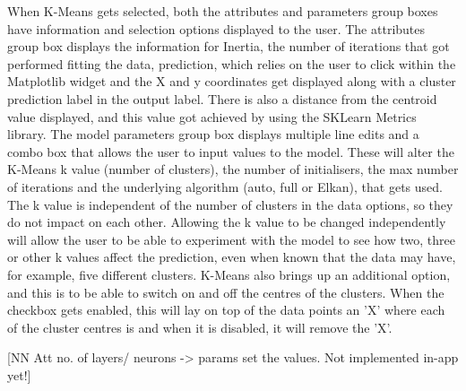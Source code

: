 	When K-Means gets selected, both the attributes and parameters group boxes have information and selection options displayed to the user. The attributes group box displays the information for Inertia, the number of iterations that got performed fitting the data, prediction, which relies on the user to click within the Matplotlib widget and the X and y coordinates get displayed along with a cluster prediction label in the output label. There is also a distance from the centroid value displayed, and this value got achieved by using the SKLearn Metrics library. The model parameters group box displays multiple line edits and a combo box that allows the user to input values to the model. These will alter the K-Means k value (number of clusters), the number of initialisers, the max number of iterations and the underlying algorithm (auto, full or Elkan), that gets used.  The k value is independent of the number of clusters in the data options, so they do not impact on each other. Allowing the k value to be changed independently will allow the user to be able to experiment with the model to see how two, three or other k values affect the prediction, even when known that the data may have, for example, five different clusters. K-Means also brings up an additional option, and this is to be able to switch on and off the centres of the clusters. When the checkbox gets enabled, this will lay on top of the data points an 'X' where each of the cluster centres is and when it is disabled, it will remove the 'X'.
	
	[NN Att no. of layers/ neurons -> params set the values. Not implemented in-app yet!]
	
